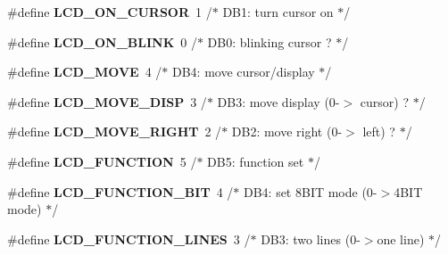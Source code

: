 \begin{DoxyCompactItemize}
\item 
\#define {\bfseries L\+C\+D\+\_\+\+O\+N\+\_\+\+C\+U\+R\+S\+OR}~1      /$\ast$   D\+B1\+: turn cursor on               $\ast$/\hypertarget{group__pfleury__lcd_ga47638b5ebbaec9600a0ebf9a55caf802}{}\label{group__pfleury__lcd_ga47638b5ebbaec9600a0ebf9a55caf802}

\item 
\#define {\bfseries L\+C\+D\+\_\+\+O\+N\+\_\+\+B\+L\+I\+NK}~0      /$\ast$     D\+B0\+: blinking cursor ?          $\ast$/\hypertarget{group__pfleury__lcd_ga5d76592a978537acee615098ce4d80f5}{}\label{group__pfleury__lcd_ga5d76592a978537acee615098ce4d80f5}

\item 
\#define {\bfseries L\+C\+D\+\_\+\+M\+O\+VE}~4      /$\ast$ D\+B4\+: move cursor/display            $\ast$/\hypertarget{group__pfleury__lcd_ga3f4f758b80fcfa6c9e4db58e2515c78a}{}\label{group__pfleury__lcd_ga3f4f758b80fcfa6c9e4db58e2515c78a}

\item 
\#define {\bfseries L\+C\+D\+\_\+\+M\+O\+V\+E\+\_\+\+D\+I\+SP}~3      /$\ast$   D\+B3\+: move display (0-\/$>$ cursor) ?  $\ast$/\hypertarget{group__pfleury__lcd_gaaddc2afa9a02bfa748950f2c1e6a204d}{}\label{group__pfleury__lcd_gaaddc2afa9a02bfa748950f2c1e6a204d}

\item 
\#define {\bfseries L\+C\+D\+\_\+\+M\+O\+V\+E\+\_\+\+R\+I\+G\+HT}~2      /$\ast$   D\+B2\+: move right (0-\/$>$ left) ?      $\ast$/\hypertarget{group__pfleury__lcd_ga97cdb19acf109ad52ab4994d2ad02cee}{}\label{group__pfleury__lcd_ga97cdb19acf109ad52ab4994d2ad02cee}

\item 
\#define {\bfseries L\+C\+D\+\_\+\+F\+U\+N\+C\+T\+I\+ON}~5      /$\ast$ D\+B5\+: function set                   $\ast$/\hypertarget{group__pfleury__lcd_ga50de1697f1da8ab075a6b4d7aeace64e}{}\label{group__pfleury__lcd_ga50de1697f1da8ab075a6b4d7aeace64e}

\item 
\#define {\bfseries L\+C\+D\+\_\+\+F\+U\+N\+C\+T\+I\+O\+N\+\_\+B\+IT}~4      /$\ast$   D\+B4\+: set 8\+B\+I\+T mode (0-\/$>$4\+B\+I\+T mode) $\ast$/\hypertarget{group__pfleury__lcd_ga91d15d8e3008f6cb141406a8b5d0d3c0}{}\label{group__pfleury__lcd_ga91d15d8e3008f6cb141406a8b5d0d3c0}

\item 
\#define {\bfseries L\+C\+D\+\_\+\+F\+U\+N\+C\+T\+I\+O\+N\+\_\+L\+I\+N\+ES}~3      /$\ast$   D\+B3\+: two lines (0-\/$>$one line)      $\ast$/\hypertarget{group__pfleury__lcd_ga6c24806bed18d565917165caa3475463}{}\label{group__pfleury__lcd_ga6c24806bed18d565917165caa3475463}


\end{DoxyCompactItemize}
